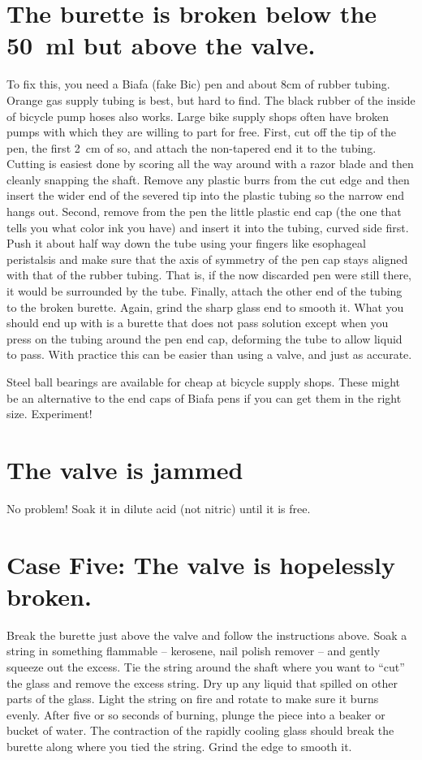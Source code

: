 \section{The burette is broken below the 50~ml but above the valve.}
To fix this, 
you need a Biafa (fake Bic) pen and about 8cm of rubber tubing. 
Orange gas supply tubing is best, 
but hard to find. 
The black rubber of the inside of bicycle pump hoses also works. 
Large bike supply shops often have broken pumps 
with which they are willing to part for free. 
First, 
cut off the tip of the pen, 
the first 2~cm of so, 
and attach the non-tapered end it to the tubing. 
Cutting is easiest done by scoring all the way around 
with a razor blade and then cleanly snapping the shaft. 
Remove any plastic burrs from the cut edge 
and then insert the wider end of the severed tip 
into the plastic tubing so the narrow end hangs out. 
Second, 
remove from the pen the little plastic end cap 
(the one that tells you what color ink you have) 
and insert it into the tubing, 
curved side first. 
Push it about half way down the tube using your 
fingers like esophageal peristalsis and make sure that 
the axis of symmetry of the pen cap stays aligned 
with that of the rubber tubing. 
That is, 
if the now discarded pen were still there, 
it would be surrounded by the tube. 
Finally, 
attach the other end of the tubing to the broken burette. 
Again, 
grind the sharp glass end to smooth it. 
What you should end up with is a burette that does not pass solution 
except when you press on the tubing around the pen end cap, 
deforming the tube to allow liquid to pass. 
With practice this can be easier than using a valve, 
and just as accurate.

Steel ball bearings are available for cheap at bicycle supply shops. 
These might be an alternative to the end caps of Biafa pens 
if you can get them in the right size. 
Experiment!

\section{The valve is jammed}
No problem! Soak it in dilute acid (not nitric) until it is free.

\section{Case Five: The valve is hopelessly broken.}
Break the burette just above the valve and follow the instructions above. 
Soak a string in something flammable – kerosene, 
nail polish remover – and gently squeeze out the excess. 
Tie the string around the shaft where 
you want to “cut” the glass and remove the excess string. 
Dry up any liquid that spilled on other parts of the glass. 
Light the string on fire and rotate to make sure it burns evenly. 
After five or so seconds of burning, 
plunge the piece into a beaker or bucket of water. 
The contraction of the rapidly cooling glass 
should break the burette along where you tied the string. 
Grind the edge to smooth it.


